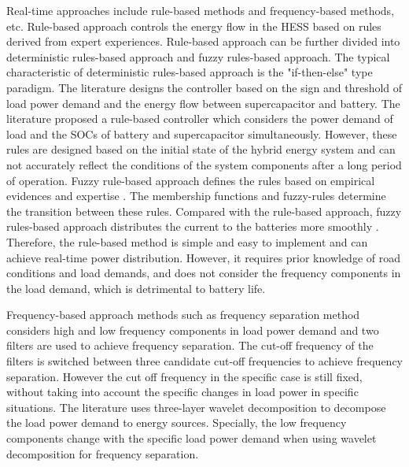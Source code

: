\documentclass[energies,article,submit,moreauthors,pdftex,10pt,a4paper]{Definitions/mdpi}
\begin{document}
Real-time approaches include rule-based methods and frequency-based methods, etc.
Rule-based approach controls the energy flow in the HESS based on rules derived from expert experiences. Rule-based approach can be further divided into deterministic rules-based approach and fuzzy rules-based approach. The typical characteristic of deterministic rules-based approach is the "if-then-else" type paradigm. The literature \cite{IEEEhowto:intro16} designs the controller based on the sign and threshold of load power demand and the energy flow between supercapacitor and battery. The literature \cite{IEEEhowto:intro12} proposed a rule-based controller which considers the power demand of load and the SOCs of battery and supercapacitor simultaneously. However, these rules are designed based on the initial state of the hybrid energy system and can not accurately reflect the conditions of the system components after a long period of operation.
Fuzzy rule-based approach defines the rules based on empirical evidences and expertise \cite{IEEEhowto:intro18}. The membership functions and fuzzy-rules determine the transition between these rules. Compared with the rule-based approach,
 fuzzy rules-based approach distributes the current to the batteries more smoothly \cite{IEEEhowto:intro19}.
Therefore, the rule-based method is simple and easy to implement and can achieve real-time power distribution. However, it requires prior knowledge of road conditions and load demands, and does not consider the frequency components in the load demand, which is detrimental to battery life.

Frequency-based approach methods such as frequency separation method
\cite{IEEEhowto:intro20} considers high and low frequency components in load power demand  and two filters are used to achieve frequency separation. The cut-off frequency of the filters is switched between three candidate cut-off frequencies to achieve frequency separation. However the cut off frequency in the specific case is still fixed, without taking into account the specific changes in load power in specific situations. 
The literature \cite{IEEEhowto:intro24} uses three-layer wavelet decomposition to decompose the load power demand to energy sources.
Specially, the low frequency components change with the specific load power demand
when using wavelet decomposition for frequency separation\cite{IEEEhowto:wavelet1}.
\end{document}
